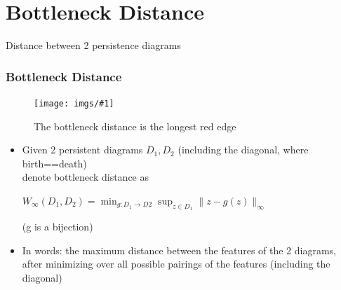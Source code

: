 \documentclass[9pt, dvipsnames]{beamer} %
\def\norm#1{\mathopen\| #1 \mathclose\|}%
\newcommand {\image}[3] {
    \begin{figure}
        \begin{center}
		\texttt{[image: imgs/\#1]}
		\caption{#2}
        \end{center}
    \end{figure}
}
\begin{document}
    \section{Bottleneck Distance}\label{sec:bnd}
    \begin{frame}
	    \centerline{Distance between 2 persistence diagrams}
        \frametitle{\textbf{Bottleneck Distance}}
	\image{bottleneck_distance_example.png}{The bottleneck distance is the longest red edge}{0.7}
    \end{frame}
    \begin{frame}
	\begin{itemize}
		\item
			Given 2 persistent diagrams $D_1, D_2$ (including the diagonal, where birth==death)\\
			denote bottleneck distance as\\
		\centerline{$W_\infty (D_1, D_2) = \min_{g: D_1 \to D2} \sup_{z \in D_1} \norm{z - g(z)}_\infty$}
		(g is a bijection)
		\item
			In words: the maximum distance between the features of the 2 diagrams,\\
			after minimizing over all possible pairings of the features (including the diagonal)
	\end{itemize}
    \end{frame}
\end{document}
